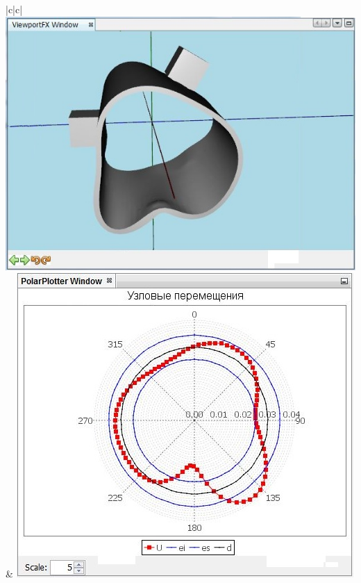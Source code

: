 \documentclass[14pt,oneside,final]{extreport}
\begin{document}
\begin{appendices}
\begin{table}[]
{{\begin{tabu}[]{|c|c|}
					\includegraphics[scale=0.55]{img/simulation-force-test-model2} & \includegraphics[scale=0.55]{img/simulation-force-test-graph2}  \\ 
					\hline
					 \\ \hline

\end{tabu}}}
\end{table}
\end{appendices}
\end{document}

